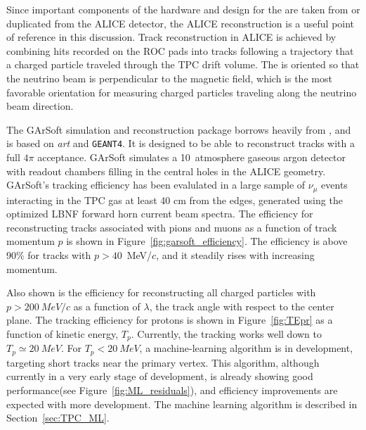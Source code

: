 %

Since important components of the hardware and design for the  are taken from or duplicated from the ALICE detector, the ALICE reconstruction is a useful point of reference in this discussion.
Track reconstruction in ALICE is achieved by combining hits recorded on the ROC pads into tracks following a trajectory that a charged particle traveled through the TPC drift volume.  The  is oriented so that the neutrino beam is perpendicular to the magnetic field, which is the most favorable orientation for measuring charged particles traveling along the neutrino beam direction.   

The GArSoft simulation and reconstruction package borrows heavily from  , and is based on {\it art} and {\tt GEANT4}.  It is designed to be able to reconstruct tracks with a full $4\pi$ acceptance.   GArSoft simulates a 10~atmosphere gaseous argon detector with readout chambers filling in the central holes in the ALICE geometry.  GArSoft's tracking efficiency has been evalulated in a large sample of  $\nu_\mu$ events interacting in the TPC gas at least 40 cm from the edges, generated using the optimized LBNF forward horn current beam spectra. The efficiency
for reconstructing tracks associated with pions and muons as a function of track momentum $p$ is shown in  Figure~\ref{fig:garsoft_efficiency}.  The efficiency is above 90\% for tracks with $p>40$~MeV/$c$, and it steadily rises with increasing momentum.  

Also shown is the efficiency for reconstructing all charged particles with $p>\SI{200}{MeV/c}$ as a function of $\lambda$,  the track angle with respect to the center plane.  The tracking efficiency for protons is shown in Figure~\ref{fig:TEpr} as a function of kinetic energy, $T_p$.  Currently, the tracking works well down to $T_p \simeq \SI{20}{MeV}$. For $T_p < \SI{20}{MeV}$, a machine-learning algorithm is in development, targeting short tracks near the primary vertex. This algorithm, although currently in a very early stage of development, is already showing good performance(see Figure~\ref{fig:ML_residuals}), and efficiency improvements are expected with more development. The machine learning algorithm is described in Section~\ref{sec:TPC_ML}.

